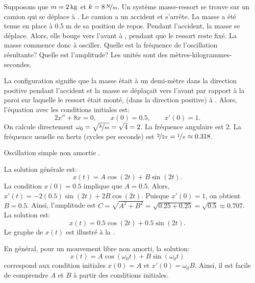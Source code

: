 \begin{example}
	Supposons que $m=\unit[2]{kg}$ et $k=\unitfrac[8]{N}{m}$.  
	Un système masse-ressort se trouve sur un camion qui se déplace à  .
	Le camion a un accident et s'arrête.  
	La masse a été tenue en place à 0.5 m de sa position de repos. Pendant l'accident, la masse se déplace. 
	Alors, elle bouge vers l'avant à , pendant que le ressort reste fixé.   
	La masse commence donc à osciller. Quelle est la fréquence de l'oscillation résultante? 
	Quelle est l'amplitude? Les unités sont des  mètres-kilogrammes-secondes.
	
	La configuration signifie que la masse était à un demi-mètre dans la 
	direction positive pendant l'accident et la masse se déplaçait vers l'avant 
	par rapport à la paroi sur laquelle le ressort était monté,
	(dans la direction positive) à .  
	Alors, l'équation avec les conditions initiales est: 
	\begin{equation*}
		2 x'' + 8 x = 0 , \qquad x(0) = 0.5, \qquad x'(0) = 1.
	\end{equation*}
	On calcule directement $\omega_0 = \sqrt{\nicefrac{k}{m}} = \sqrt{4} = 2$.
	La fréquence angulaire est 2.  La fréquence usuelle en hertz (cycles per
	seconde) est $\nicefrac{2}{2\pi} = \nicefrac{1}{\pi} \approx 0.318$.
	
	\begin{mywrapfig}[15]{3.25in}
	\capstart {}
	\caption{Oscillation simple non amortie .\label{mv:undampedfig}}
	\end{mywrapfig}
	
	La solution générale est: 
	\begin{equation*}
		x(t) = A \cos (2t) + B \sin (2t) .
	\end{equation*}
	La condition $x(0) = 0.5$ implique que $A = 0.5$.  
	Alors, $x'(t) = - 2(0.5) \sin (2t) + 2B \cos (2t)$.
	Puisque $x'(0) = 1$, on obtient $B = 0.5$.  Ainsi, l'amplitude est
	$C = \sqrt{A^2+B^2} = \sqrt{0.25+0.25} = \sqrt{0.5} \approx 0.707$. 
	La solution est: 
	\begin{equation*}
		x(t) = 0.5 \cos (2t) + 0.5 \sin (2t) .
	\end{equation*}
	Le graphe de  $x(t)$ est illustré à la  .
\end{example}

En général, pour un mouvement libre non amorti, la solution: 
\begin{equation*}
	x(t) = A \cos (\omega_0 t) + B \sin (\omega_0 t) 
\end{equation*}
correspond aux condition initiales $x(0) = A$ et $x'(0) = \omega_0 B$.
Ainsi, il est facile de comprendre $A$ et $B$ à partir des conditions initiales. 

